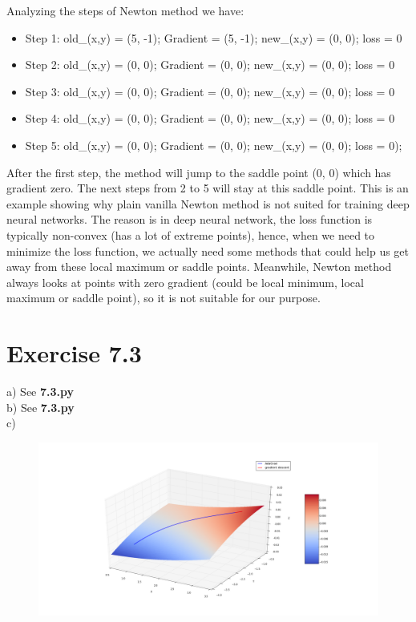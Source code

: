 \documentclass{article}
\begin{document}
Analyzing the steps of Newton method we have:
\begin{itemize}
\item Step 1: old\_(x,y) = (5, -1); Gradient = (5, -1); new\_(x,y) = (0, 0); loss = 0
\item Step 2: old\_(x,y) = (0, 0); Gradient = (0, 0); new\_(x,y) = (0, 0); loss = 0
\item Step 3: old\_(x,y) = (0, 0); Gradient = (0, 0); new\_(x,y) = (0, 0); loss = 0
\item Step 4: old\_(x,y) = (0, 0); Gradient = (0, 0); new\_(x,y) = (0, 0); loss = 0
\item Step 5: old\_(x,y) = (0, 0); Gradient = (0, 0); new\_(x,y) = (0, 0); loss = 0);
\end{itemize}

After the first step, the method will jump to the saddle point (0, 0) which has gradient zero. The next steps from 2 to 5 will stay at this saddle point. This is an example showing why plain vanilla Newton method is not suited for training deep neural networks. The reason is in deep neural network, the loss function is typically non-convex (has a lot of extreme points), hence, when we need to minimize the loss function, we actually need some methods that could help us get away from these local maximum or saddle points. Meanwhile, Newton method always looks at points with zero gradient (could be local minimum, local maximum or saddle point), so it is not suitable for our purpose.
\newpage
\section*{Exercise 7.3}
a) See \textbf{7.3.py}\\
b) See \textbf{7.3.py}\\
c)
\begin{figure}[ht]
	\centering
	\includegraphics[scale=0.3]{73.png}
\end{figure}
\end{document}
